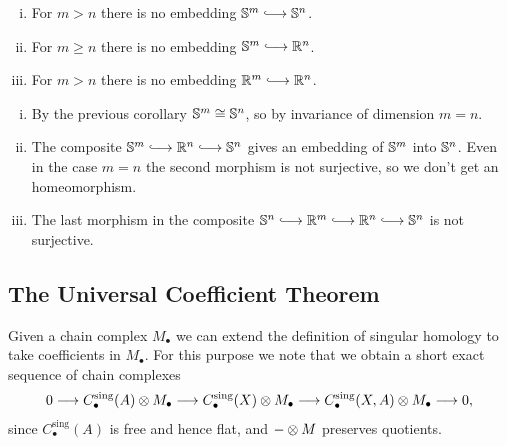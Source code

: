 	\begin{corollary}
		\vspace{-1.5em}
		\begin{enumerate}[(i)]
			\item{
				For $m > n$ there is no embedding $\S^m \longrightincl \S^n$.
			}
			\item{
				For $m \geq n$ there is no embedding $\S^m \longrightincl \R^n$.
			}
			\item{
				For $m > n$ there is no embedding $\R^m \longrightincl \R^n$.
			}
		\end{enumerate}
	\end{corollary}
	\begin{sketch}
		\begin{enumerate}[(i)]
			\item{
				By the previous corollary $\S^m \isom \S^n$, so by invariance of dimension $m = n$.
			}
			\item{
				The composite $\S^m \longrightincl \R^n \longrightincl \S^n$ gives an embedding of $\S^m$ into $\S^n$. Even in the case $m=n$ the second morphism is not surjective, so we don't get an homeomorphism.
			}
			\item{
				The last morphism in the composite $\S^n \longrightincl \R^m \longrightincl \R^n \longrightincl \S^n$ is not surjective.
			}
			\vspace{-1.8em}
		\end{enumerate}
	\end{sketch}

	\newpage
	\subsection{The Universal Coefficient Theorem}

	Given a chain complex $M_\bullet$ we can extend the definition of singular homology to take coefficients in $M_\bullet$. For this purpose we note that we obtain a short exact sequence of chain complexes
	\begin{align*}
		0 --> C_\bullet^\text{sing}(A) \tensor M_\bullet --> C_\bullet^\text{sing}(X) \tensor M_\bullet --> C_\bullet^\text{sing}(X,A) \tensor M_\bullet --> 0,
	\end{align*}
	since $C_\bullet^\text{sing}(A)$ is free and hence flat, and $- \tensor M$ preserves quotients.

